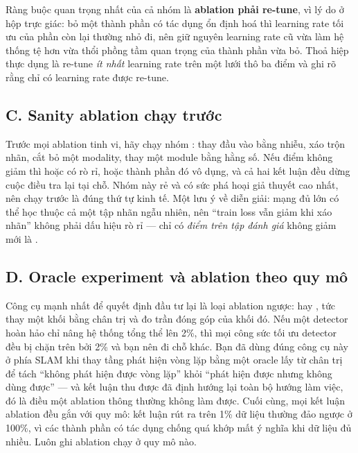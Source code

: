 \documentclass[../../deep_learning.tex]{subfiles}
\begin{document}
Ràng buộc quan trọng nhất của cả nhóm là \textbf{ablation phải re-tune}, vì lý do ở hộp trực giác: bỏ một thành phần có tác dụng ổn định hoá thì learning rate tối ưu của phần còn lại thường nhỏ đi, nên giữ nguyên learning rate cũ vừa làm hệ thống tệ hơn vừa thổi phồng tầm quan trọng của thành phần vừa bỏ. Thoả hiệp thực dụng là re-tune \emph{ít nhất} learning rate trên một lưới thô ba điểm và ghi rõ rằng chỉ có learning rate được re-tune.

\subsection{C. Sanity ablation chạy trước}
Trước mọi ablation tinh vi, hãy chạy nhóm : thay đầu vào bằng nhiễu, xáo trộn nhãn, cắt bỏ một modality, thay một module bằng hằng số. Nếu điểm không giảm thì hoặc có rò rỉ, hoặc thành phần đó vô dụng, và cả hai kết luận đều dừng cuộc điều tra lại tại chỗ. Nhóm này rẻ và có sức phá hoại giả thuyết cao nhất, nên chạy trước là đúng thứ tự kinh tế. Một lưu ý về diễn giải: mạng đủ lớn có thể học thuộc cả một tập nhãn ngẫu nhiên, nên ``train loss vẫn giảm khi xáo nhãn'' không phải dấu hiệu rò rỉ — chỉ có \emph{điểm trên tập đánh giá} không giảm mới là \cite{zhang2017rethinking}.

\subsection{D. Oracle experiment và ablation theo quy mô}
Công cụ mạnh nhất để quyết định đầu tư lại là loại ablation ngược:  hay , tức thay một khối bằng chân trị và đo trần đóng góp của khối đó. Nếu một detector hoàn hảo chỉ nâng hệ thống tổng thể lên 2\%, thì mọi công sức tối ưu detector đều bị chặn trên bởi 2\% và bạn nên đi chỗ khác. Bạn đã dùng đúng công cụ này ở phía SLAM khi thay tầng phát hiện vòng lặp bằng một oracle lấy từ chân trị để tách ``không phát hiện được vòng lặp'' khỏi ``phát hiện được nhưng không dùng được'' — và kết luận thu được đã định hướng lại toàn bộ hướng làm việc, đó là điều một ablation thông thường không làm được. Cuối cùng, mọi kết luận ablation đều gắn với quy mô: kết luận rút ra trên 1\% dữ liệu thường đảo ngược ở 100\%, vì các thành phần có tác dụng chống quá khớp mất ý nghĩa khi dữ liệu đủ nhiều. Luôn ghi ablation chạy ở quy mô nào.
\end{document}
